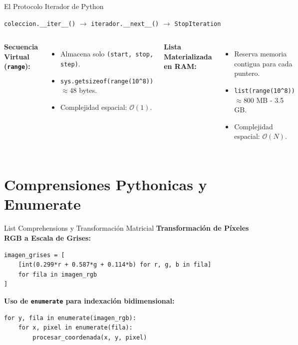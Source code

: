 \documentclass[aspectratio=169]{beamer}
\begin{document}
\begin{frame}{El Protocolo Iterador de Python}
    \begin{center}
        \texttt{coleccion.\_\_iter\_\_()} $\longrightarrow$ \texttt{iterador.\_\_next\_\_()} $\longrightarrow$ \texttt{StopIteration}
    \end{center}
    \vspace{0.3cm}
    \begin{columns}
        \textbf{Secuencia Virtual (\texttt{range}):}
        \begin{itemize}
            \item Almacena solo \texttt{(start, stop, step)}.
            \item \texttt{sys.getsizeof(range(10\^{}8))} $\approx 48$ bytes.
            \item Complejidad espacial: $\mathcal{O}(1)$.
        \end{itemize}
        \textbf{Lista Materializada en RAM:}
        \begin{itemize}
            \item Reserva memoria contigua para cada puntero.
            \item \texttt{list(range(10\^{}8))} $\approx 800$ MB - 3.5 GB.
            \item Complejidad espacial: $\mathcal{O}(N)$.
        \end{itemize}
    \end{columns}
\end{frame}

\section{Comprensiones Pythonicas y Enumerate}

\begin{frame}[fragile]{List Comprehensions y Transformación Matricial}
    \textbf{Transformación de Píxeles RGB a Escala de Grises:}
\begin{lstlisting}
imagen_grises = [
    [int(0.299*r + 0.587*g + 0.114*b) for r, g, b in fila]
    for fila in imagen_rgb
]
\end{lstlisting}
    \vspace{0.2cm}
    \textbf{Uso de \texttt{enumerate} para indexación bidimensional:}
\begin{lstlisting}
for y, fila in enumerate(imagen_rgb):
    for x, pixel in enumerate(fila):
        procesar_coordenada(x, y, pixel)
\end{lstlisting}
\end{frame}
\end{document}
